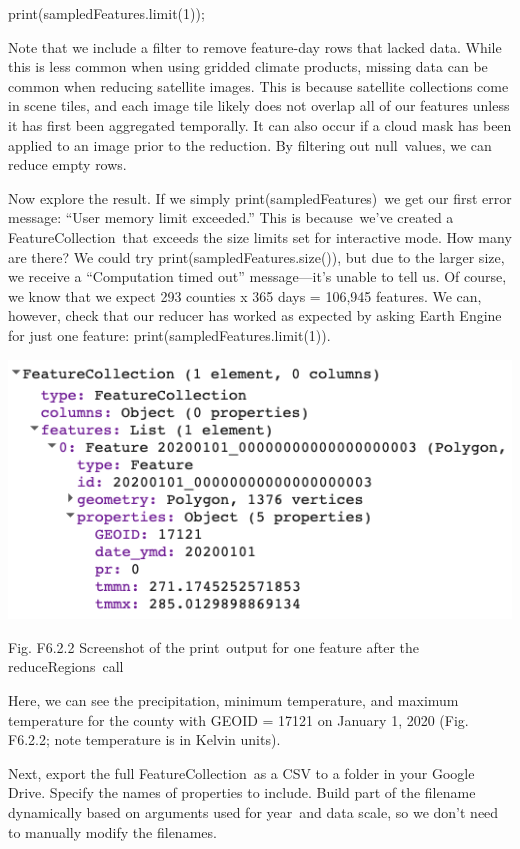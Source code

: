 \documentclass[
  letterpaper,
  DIV=11,
  numbers=noendperiod]{scrreprt}
\begin{document}
print(sampledFeatures.limit(1));

Note that we include a filter to remove feature-day rows that lacked
data. While this is less common when using gridded climate products,
missing data can be common when reducing satellite images. This is
because satellite collections come in scene tiles, and each image tile
likely does not overlap all of our features unless it has first been
aggregated temporally. It can also occur if a cloud mask has been
applied to an image prior to the reduction. By filtering out
null~values, we can reduce empty rows.

Now explore the result. If we simply print(sampledFeatures)~we get our
first error message: ``User memory limit exceeded.'' This is
because~we've created a FeatureCollection~that exceeds the size limits
set for interactive mode. How many are there? We could try
print(sampledFeatures.size()), but due to the larger size, we receive a
``Computation timed out'' message---it's unable to tell us. Of course,
we know that we expect 293 counties x 365 days = 106,945 features. We
can, however, check that our reducer has worked as expected by asking
Earth Engine for just one feature: print(sampledFeatures.limit(1)).

\includegraphics{./F6/image75.png}

Fig. F6.2.2 Screenshot of the print~output for one feature after the
reduceRegions~call

Here, we can see the precipitation, minimum temperature, and maximum
temperature for the county with GEOID = 17121 on January 1, 2020 (Fig.
F6.2.2; note temperature is in Kelvin units).

Next, export the full FeatureCollection~as a CSV to a folder in your
Google Drive. Specify the names of properties to include. Build part of
the filename dynamically based on arguments used for year~and data
scale, so we don't need to manually modify the filenames.
\end{document}
